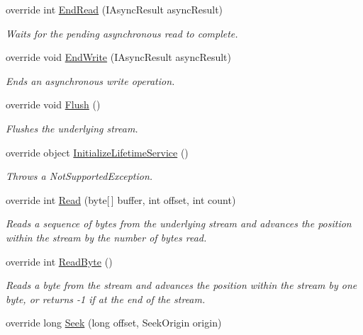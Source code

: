 \begin{DoxyCompactItemize}
override int \hyperlink{class_p_http_1_1_http_output_stream_a313ebbb0a9983abe53c62a9e92f7fc5e}{End\+Read} (I\+Async\+Result async\+Result)
\begin{DoxyCompactList}\small\item\em Waits for the pending asynchronous read to complete. \end{DoxyCompactList}\item 
override void \hyperlink{class_p_http_1_1_http_output_stream_a1d31db11e5cf74a49016f88321961a59}{End\+Write} (I\+Async\+Result async\+Result)
\begin{DoxyCompactList}\small\item\em Ends an asynchronous write operation. \end{DoxyCompactList}\item 
override void \hyperlink{class_p_http_1_1_http_output_stream_ac3b05f512ec2d4b33740fed1f4a17a30}{Flush} ()
\begin{DoxyCompactList}\small\item\em Flushes the underlying stream. \end{DoxyCompactList}\item 
override object \hyperlink{class_p_http_1_1_http_output_stream_a4a420caafc304a3b28686f4b8e31a149}{Initialize\+Lifetime\+Service} ()
\begin{DoxyCompactList}\small\item\em Throws a Not\+Supported\+Exception. \end{DoxyCompactList}\item 
override int \hyperlink{class_p_http_1_1_http_output_stream_a7e144ab792ca62257b338bfebc74de51}{Read} (byte\mbox{[}$\,$\mbox{]} buffer, int offset, int count)
\begin{DoxyCompactList}\small\item\em Reads a sequence of bytes from the underlying stream and advances the position within the stream by the number of bytes read. \end{DoxyCompactList}\item 
override int \hyperlink{class_p_http_1_1_http_output_stream_a2983fe0c04f7276553396d7c8bc86928}{Read\+Byte} ()
\begin{DoxyCompactList}\small\item\em Reads a byte from the stream and advances the position within the stream by one byte, or returns -\/1 if at the end of the stream. \end{DoxyCompactList}\item 
override long \hyperlink{class_p_http_1_1_http_output_stream_ae15f3bb25db9f145175e0b870263feb5}{Seek} (long offset, Seek\+Origin origin)

\end{DoxyCompactItemize}
